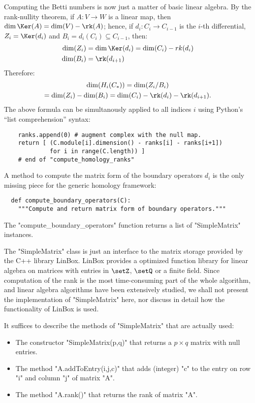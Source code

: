 Computing the Betti numbers is now just a matter of basic linear algebra.
By the rank-nullity theorem, if $A:V\to W$ is a linear map,
then $\dim\Ker(A) =  \dim(V) - \rk(A)$; hence, if $d_i: C_i \to
C_{i-1}$ is the $i$-th differential, $Z_i = \Ker(d_i)$ and $B_i =
d_i(C_i) \subseteq C_{i-1}$, then:
\begin{align*}
  \dim(Z_i) &= \dim\Ker(d_i) = \dim(C_i) - rk(d_i) 
  \\
  \dim(B_i) &= \rk(d_{i+1})
\end{align*}
Therefore:
\begin{multline*}
  \dim(H_i(C_*)) = \dim(Z_i / B_i) 
  \\
  = \dim(Z_i) - \dim(B_i)
            = \dim(C_i) - \rk(d_i) - \rk(d_{i+1}).
\end{multline*}
The above formula can be simultanously applied to all indices $i$
using Python's ``list comprehension'' syntax:
\begin{lstlisting}
    ranks.append(0) # augment complex with the null map.
    return [ (C.module[i].dimension() - ranks[i] - ranks[i+1])
             for i in range(C.length)) ]
    # end of "compute_homology_ranks"

\end{lstlisting}

A method to compute the matrix form of the boundary operators $d_i$ is
the only missing piece for the generic homology framework:
\begin{lstlisting}
  def compute_boundary_operators(C):
    """Compute and return matrix form of boundary operators."""

\end{lstlisting}
The "compute_boundary_operators" function returns a list of
"SimpleMatrix" instances.  

The "SimpleMatrix" class is just an interface to the matrix storage
provided by the C++ library LinBox.  LinBox provides
a optimized function library for linear algebra on matrices with
entries in $\setZ$, $\setQ$ or a finite field.  Since computation of
the rank is the most time-consuming part of the whole algorithm, and
linear algebra algorithms have been extensively
studied, we shall not present the implementation of
"SimpleMatrix" here, nor discuss in detail how the functionality of
LinBox is used.  

It suffices to describe the methods of "SimpleMatrix" that are
actually used:
\begin{itemize}
\item The constructor "SimpleMatrix(p,q)" that returns a $p \times q$
  matrix with null entries.
\item The method "A.addToEntry(i,j,c)" that adds (integer) "c" to the
  entry on row "i" and column "j" of matrix "A".
\item The method "A.rank()" that returns the rank of matrix "A".
\end{itemize}

